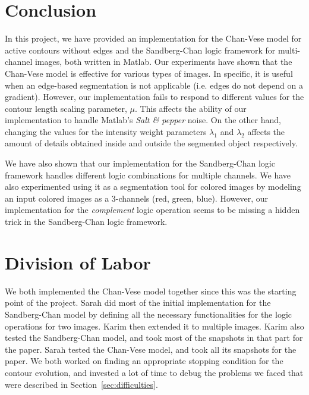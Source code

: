 \documentclass[10pt,twocolumn,letterpaper]{article}
\begin{document}
\section{Conclusion}
\label{sec:concl}
In this project, we have provided an implementation for the Chan-Vese model for active contours without edges and the Sandberg-Chan logic framework for
multi-channel images, both written in Matlab. Our experiments have shown that the Chan-Vese model is effective for various types of images. In specific, it is
useful when an edge-based segmentation is not applicable (i.e. edges do not depend on a gradient). However, our implementation fails to respond to different
values for the contour length scaling parameter, $\mu$. This affects the ability of our implementation to handle Matlab's \textit{Salt \& pepper} noise. On the
other hand, changing the values for the intensity weight parameters $\lambda_1$ and $\lambda_2$ affects the amount of details obtained inside and outside the
segmented object respectively.

We have also shown that our implementation for the Sandberg-Chan logic framework handles different logic combinations for multiple channels. We have also
experimented using it as a segmentation tool for colored images by modeling an input colored images as a 3-channels (red, green, blue). However, our
implementation for the \textit{complement} logic operation seems to be missing a hidden trick in the Sandberg-Chan logic framework.






\appendix
\appendixpage

\section{Division of Labor}

We both implemented the Chan-Vese model together since this was the starting point of the project. Sarah did most of the initial implementation for the
Sandberg-Chan model by defining all the necessary functionalities for the logic operations for two images. Karim then extended it to multiple images. Karim
also tested the Sandberg-Chan model, and took most of the snapshots in that part for the paper. Sarah tested the Chan-Vese model, and took all its snapshots
for the paper. We both worked on finding an appropriate stopping condition for the contour evolution, and invested a lot of time to debug the problems we
faced that were described in Section~\ref{sec:difficulties}.



\end{document}
